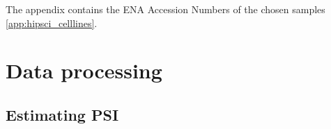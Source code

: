 The appendix contains the ENA Accession Numbers of the chosen samples \ref{app:hipsci_celllines}.

\section{Data processing}\label{sec:dataprocessing}
\subsection{Estimating PSI} \label{subsec:psiestimation}





